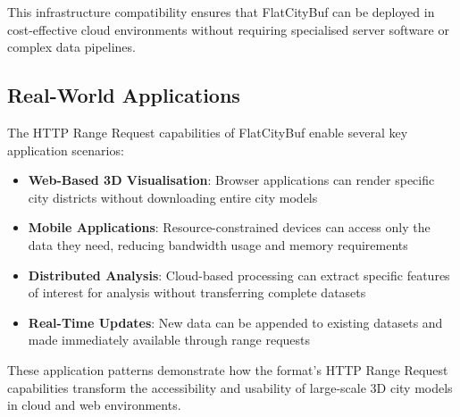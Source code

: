 This infrastructure compatibility ensures that FlatCityBuf can be deployed in cost-effective cloud environments without requiring specialised server software or complex data pipelines.

\subsection{Real-World Applications}
\label{methodology:http_range_requests:real_world_applications}

The HTTP Range Request capabilities of FlatCityBuf enable several key application scenarios:

\begin{itemize}
    \item \textbf{Web-Based 3D Visualisation}: Browser applications can render specific city districts without downloading entire city models

    \item \textbf{Mobile Applications}: Resource-constrained devices can access only the data they need, reducing bandwidth usage and memory requirements

    \item \textbf{Distributed Analysis}: Cloud-based processing can extract specific features of interest for analysis without transferring complete datasets

    \item \textbf{Real-Time Updates}: New data can be appended to existing datasets and made immediately available through range requests
\end{itemize}

These application patterns demonstrate how the format's HTTP Range Request capabilities transform the accessibility and usability of large-scale 3D city models in cloud and web environments.
